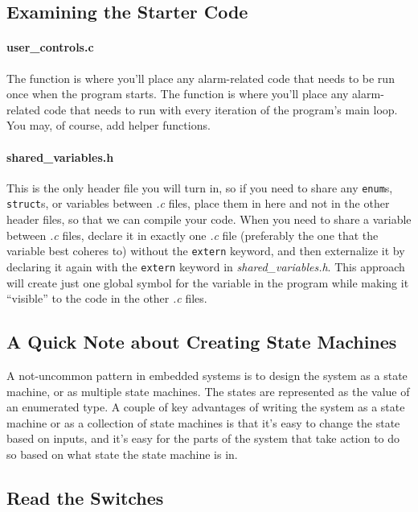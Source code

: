 \subsection{Examining the Starter Code}

\paragraph{user\_controls.c}
The  function is where you'll place any alarm-related code that needs to be run once when the program starts.
The  function is where you'll place any alarm-related code that needs to run with every iteration of the program's main loop.
You may, of course, add helper functions.

\paragraph{shared\_variables.h}
This is the only header file you will turn in, so if you need to share any \lstinline{enum}s, \lstinline{struct}s, or variables between \textit{.c} files, place them in here and not in the other header files, so that we can compile your code.
When you need to share a variable between \textit{.c} files, declare it in exactly one \textit{.c} file (preferably the one that the variable best coheres to) without the \lstinline{extern} keyword,
and then externalize it by declaring it again with the \lstinline{extern} keyword in \textit{shared\_variables.h}.
This approach will create just one global symbol for the variable in the program while making it ``visible'' to the code in the other \textit{.c} files.

\subsection{A Quick Note about Creating State Machines}

A not-uncommon pattern in embedded systems is to design the system as a state machine, or as multiple state machines.
The states are represented as the value of an enumerated type.
A couple of key advantages of writing the system as a state machine or as a collection of state machines is that it's easy to change the state based on inputs,
and it's easy for the parts of the system that take action to do so based on what state the state machine is in.

\subsection{Read the Switches}

